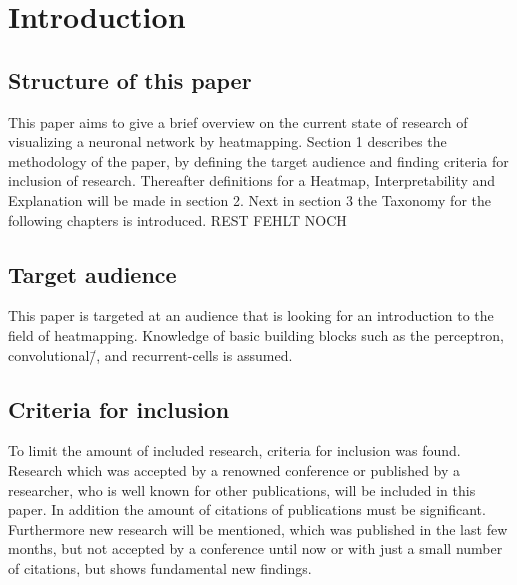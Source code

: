\section{Introduction}
\blindtext[3]

\subsection{Structure of this paper}
This paper aims to give a brief overview on the current state of research of visualizing a neuronal network by heatmapping. Section 1 describes the methodology of the paper, by defining the target audience and finding criteria for inclusion of research.
Thereafter definitions for a Heatmap, Interpretability and Explanation will be made in section 2. Next in section 3 the Taxonomy for the following chapters is introduced. REST FEHLT NOCH


\subsection{Target audience}
This paper is targeted at an audience that is looking for an introduction to 
the field of heatmapping. Knowledge of basic building blocks such as the 
perceptron, convolutional\=/, and recurrent-cells is assumed.

\subsection{Criteria for inclusion}
To limit the amount of included research, criteria for inclusion was found. Research which was accepted by a renowned conference or published by a researcher, who is well known for other publications, will be included in this paper. In addition the amount of citations of publications must be significant. Furthermore new research will be mentioned, which was published in the last few months, but not accepted by a conference until now or with just a small number of citations, but shows fundamental new findings.